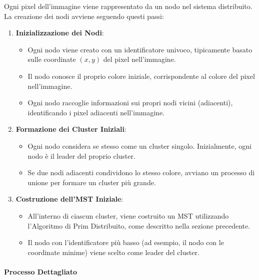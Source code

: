 \documentclass[12pt, a4paper]{report}
\begin{document}
Ogni pixel dell'immagine viene rappresentato da un nodo nel sistema distribuito. La creazione dei nodi avviene seguendo questi passi:

\begin{enumerate}
    \item \textbf{Inizializzazione dei Nodi}:
    \begin{itemize}
        \item Ogni nodo viene creato con un identificatore univoco, tipicamente basato sulle coordinate $(x, y)$ del pixel nell'immagine.
        \item Il nodo conosce il proprio colore iniziale, corrispondente al colore del pixel nell'immagine.
        \item Ogni nodo raccoglie informazioni sui propri nodi vicini (adiacenti), identificando i pixel adiacenti nell'immagine.
    \end{itemize}
    \item \textbf{Formazione dei Cluster Iniziali}:
    \begin{itemize}
        \item Ogni nodo considera se stesso come un cluster singolo. Inizialmente, ogni nodo è il leader del proprio cluster.
        \item Se due nodi adiacenti condividono lo stesso colore, avviano un processo di unione per formare un cluster più grande.
    \end{itemize}
    \item \textbf{Costruzione dell'MST Iniziale}:
    \begin{itemize}
        \item All'interno di ciascun cluster, viene costruito un MST utilizzando l'Algoritmo di Prim Distribuito, come descritto nella sezione precedente.
        \item Il nodo con l'identificatore più basso (ad esempio, il nodo con le coordinate minime) viene scelto come leader del cluster.
    \end{itemize}
\end{enumerate}

\paragraph{Processo Dettagliato}
\end{document}
